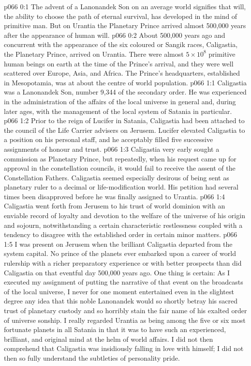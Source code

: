 \author{Melchizedek}
\vs p066 0:1 The advent of a Lanonandek Son on an average world signifies that will, the ability to choose the path of eternal survival, has developed in the mind of primitive man. But on Urantia the Planetary Prince arrived almost 500,000 years after the appearance of human will.
\vs p066 0:2 About 500,000 years ago and concurrent with the appearance of the six coloured or Sangik races, Caligastia, the Planetary Prince, arrived on Urantia. There were almost $5 \times 10^8$ primitive human beings on earth at the time of the Prince’s arrival, and they were well scattered over Europe, Asia, and Africa. The Prince’s headquarters, established in Mesopotamia, was at about the centre of world population.
\vs p066 1:1 Caligastia was a Lanonandek Son, number 9,344 of the secondary order. He was experienced in the administration of the affairs of the local universe in general and, during later ages, with the management of the local system of Satania in particular.
\vs p066 1:2 Prior to the reign of Lucifer in Satania, Caligastia had been attached to the council of the Life Carrier advisers on Jerusem. Lucifer elevated Caligastia to a position on his personal staff, and he acceptably filled five successive assignments of honour and trust.
\vs p066 1:3 \pc Caligastia very early sought a commission as Planetary Prince, but repeatedly, when his request came up for approval in the constellation councils, it would fail to receive the assent of the Constellation Fathers. Caligastia seemed especially desirous of being sent as planetary ruler to a decimal or life\hyp{}modification world. His petition had several times been disapproved before he was finally assigned to Urantia.
\vs p066 1:4 Caligastia went forth from Jerusem to his trust of world dominion with an enviable record of loyalty and devotion to the welfare of the universe of his origin and sojourn, notwithstanding a certain characteristic restlessness coupled with a tendency to disagree with the established order in certain minor matters.
\vs p066 1:5 I was present on Jerusem when the brilliant Caligastia departed from the system capital. No prince of the planets ever embarked upon a career of world rulership with a richer preparatory experience or with better prospects than did Caligastia on that eventful day 500,000 years ago. One thing is certain: As I executed my assignment of putting the narrative of that event on the broadcasts of the local universe, I never for one moment entertained even in the slightest degree any idea that this noble Lanonandek would so shortly betray his sacred trust of planetary custody and so horribly stain the fair name of his exalted order of universe sonship. I really regarded Urantia as being among the five or six most fortunate planets in all Satania in that it was to have such an experienced, brilliant, and original mind at the helm of world affairs. I did not then comprehend that Caligastia was insidiously falling in love with himself; I did not then so fully understand the subtleties of personality pride.
